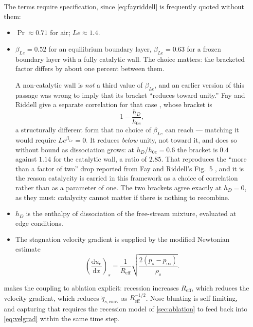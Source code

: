 \documentclass[11pt,a4paper]{article}
\theoremstyle{definition}
\numberwithin{equation}{section}
\newcommand{\diff}{\mathrm{d}}
\begin{document}
The terms require specification, since \cref{eq:fayriddell} is frequently quoted without them:
\begin{itemize}
    \item $\Pr \approx 0.71$ for air; $Le \approx 1.4$.
    \item $\beta_{Le} = 0.52$ for an equilibrium boundary layer, $\beta_{Le} = 0.63$ for a frozen boundary layer with a fully catalytic wall. The choice matters: the bracketed factor differs by about one percent between them.

    A non-catalytic wall is \emph{not} a third value of $\beta_{Le}$, and an earlier version of this passage was wrong to imply that its bracket ``reduces toward unity.'' Fay and Riddell give a separate correlation for that case \cite[Eq.~(17.91)]{anderson2006}, whose bracket is
    \begin{equation}
    \label{eq:noncatalytic}
    1 - \frac{h_D}{h_{0e}},
    \end{equation}
    a structurally different form that no choice of $\beta_{Le}$ can reach --- matching it would require $Le^{\beta_{Le}} = 0$. It reduces \emph{below} unity, not toward it, and does so without bound as dissociation grows: at $h_D/h_{0e} = 0.6$ the bracket is $0.4$ against $1.14$ for the catalytic wall, a ratio of $2.85$. That reproduces the ``more than a factor of two'' drop reported from Fay and Riddell's Fig.~5 \cite[Fig.~17.5]{anderson2006}, and it is the reason catalycity is carried in this framework as a choice of correlation rather than as a parameter of one. The two brackets agree exactly at $h_D = 0$, as they must: catalycity cannot matter if there is nothing to recombine.
    \item $h_D$ is the enthalpy of dissociation of the free-stream mixture, evaluated at edge conditions.
    \item The stagnation velocity gradient is supplied by the modified Newtonian estimate
    \begin{equation}
    \label{eq:velgrad}
    \left(\frac{\diff u_e}{\diff x}\right)_{\!s} = \frac{1}{R_{\text{eff}}}\sqrt{\frac{2(p_s - p_\infty)}{\rho_s}} .
    \end{equation}
\end{itemize}
 makes the coupling to ablation explicit: recession increases $R_{\text{eff}}$, which reduces the velocity gradient, which reduces $\dot{q}_{s,\text{conv}}$ as $R_{\text{eff}}^{-1/2}$. Nose blunting is self-limiting, and capturing that requires the recession model of \cref{sec:ablation} to feed back into \cref{eq:velgrad} within the same time step.
\end{document}
